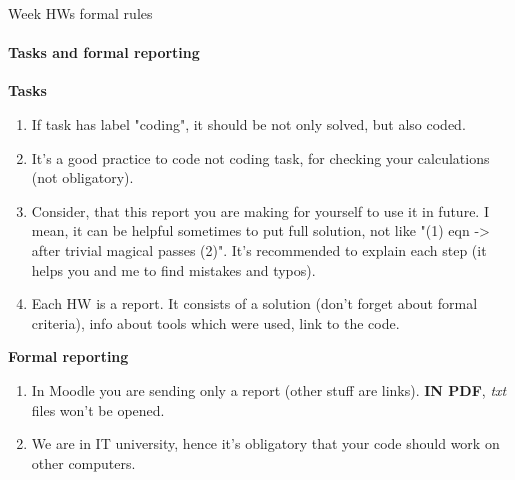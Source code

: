 \documentclass[aspectratio=169]{beamer}
\begin{document}
\begin{frame}[t]{Week HWs formal rules}
\framesubtitle{Tasks and formal reporting}
\textbf{Tasks}
\begin{enumerate}
    \footnotesize
    \item If task has label "coding", it should be not only solved, but also coded.
    \item It's a good practice to code not coding task, for checking your calculations (not obligatory).
    \item Consider, that this report you are making for yourself to use it in future. I mean, it can be helpful sometimes to put full solution, not like "(1) eqn -> after trivial magical passes (2)". It's recommended to explain each step (it helps you and me to find mistakes and typos).
    \item Each HW is a report. It consists of a solution (don't forget about formal criteria), info about tools which were used, link to the code.
\end{enumerate}
\textbf{Formal reporting}
\begin{enumerate}
    \footnotesize
    \item In Moodle you are sending only a report (other stuff are links). \textbf{IN PDF}, \textit{txt} files won't be opened.
    \item We are in IT university, hence it's obligatory that your code should work on other computers.
\end{enumerate}
\end{frame}
\end{document}
